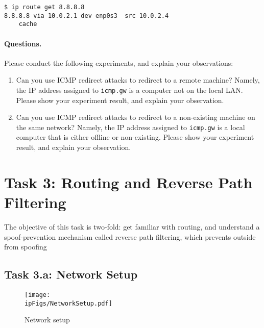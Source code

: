 \begin{lstlisting}
$ ip route get 8.8.8.8
8.8.8.8 via 10.0.2.1 dev enp0s3  src 10.0.2.4
    cache
\end{lstlisting}


\paragraph{Questions.} Please conduct the following experiments, and explain your observations:

\begin{enumerate}
\item Can you use ICMP redirect attacks to redirect to a remote machine? Namely,
the IP address assigned to \texttt{icmp.gw} is a computer not on the local LAN. 
Please show your experiment result, and explain your observation.  

\item Can you use ICMP redirect attacks to redirect to a non-existing machine on
the same network? Namely, the IP address assigned to \texttt{icmp.gw} is a local computer that
is either offline or non-existing. 
Please show your experiment result, and explain your observation.  
\end{enumerate}





\section{Task 3: Routing and Reverse Path Filtering} 


The objective of this task is two-fold: get familiar with routing, 
and understand a spoof-prevention mechanism 
called reverse path filtering, which prevents outside from spoofing 




\subsection{Task 3.a: Network Setup}
 



\begin{figure}[htb]
\begin{center}
\texttt{[image: \\ipFigs/NetworkSetup.pdf]}
\end{center}
\caption{Network setup}
\label{ip:fig:reverse_filtering}
\end{figure}

